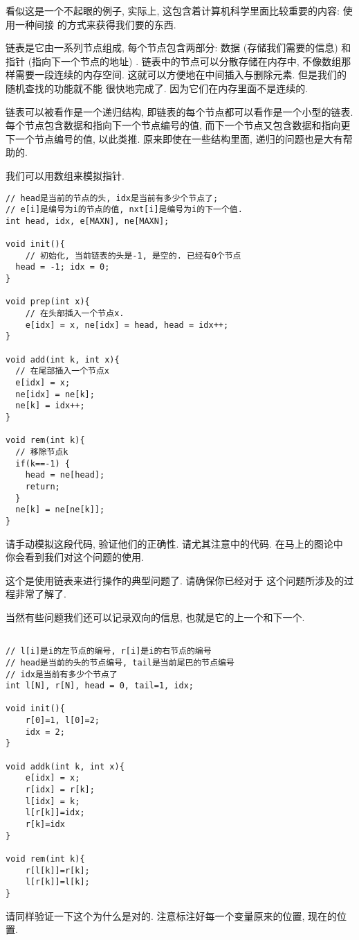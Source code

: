 看似这是一个不起眼的例子, 实际上, 这包含着计算机科学里面比较重要的内容: 使用一种间接
的方式来获得我们要的东西. 

 链表是它由一系列节点组成, 每个节点包含两部分: 
数据 (存储我们需要的信息) 和指针 (指向下一个节点的地址) . 
链表中的节点可以分散存储在内存中, 不像数组那样需要一段连续的内存空间. 
这就可以方便地在中间插入与删除元素. 但是我们的随机查找的功能就不能
很快地完成了. 因为它们在内存里面不是连续的. 

链表可以被看作是一个递归结构, 即链表的每个节点都可以看作是一个小型的链表. 
每个节点包含数据和指向下一个节点编号的值, 而下一个节点又包含数据和指向更下一个节点编号的值, 
以此类推. 
原来即使在一些结构里面, 递归的问题也是大有帮助的. 

我们可以用数组来模拟指针. 
\begin{lstlisting}
// head是当前的节点的头, idx是当前有多少个节点了; 
// e[i]是编号为i的节点的值, nxt[i]是编号为i的下一个值. 
int head, idx, e[MAXN], ne[MAXN];

void init(){
    // 初始化, 当前链表的头是-1, 是空的. 已经有0个节点
  head = -1; idx = 0;
}

void prep(int x){
    // 在头部插入一个节点x. 
    e[idx] = x, ne[idx] = head, head = idx++;
}

void add(int k, int x){
  // 在尾部插入一个节点x
  e[idx] = x;
  ne[idx] = ne[k];
  ne[k] = idx++;
}

void rem(int k){
  // 移除节点k
  if(k==-1) {
    head = ne[head];
    return;
  }
  ne[k] = ne[ne[k]];
}
\end{lstlisting}

\begin{ques}
    请手动模拟这段代码, 验证他们的正确性. 请尤其注意中的代码. 在马上的图论中
    你会看到我们对这个问题的使用. 
\end{ques}

 这个是使用链表来进行操作的典型问题了. 请确保你已经对于
这个问题所涉及的过程非常了解了. 

 当然有些问题我们还可以记录双向的信息, 也就是它的上一个和下一个.

\begin{lstlisting}

// l[i]是i的左节点的编号, r[i]是i的右节点的编号
// head是当前的头的节点编号, tail是当前尾巴的节点编号
// idx是当前有多少个节点了
int l[N], r[N], head = 0, tail=1, idx;

void init(){
    r[0]=1, l[0]=2;
    idx = 2;
}

void addk(int k, int x){
    e[idx] = x;
    r[idx] = r[k];
    l[idx] = k;
    l[r[k]]=idx;
    r[k]=idx
}

void rem(int k){
    r[l[k]]=r[k];
    l[r[k]]=l[k];
}
\end{lstlisting}
\begin{ques}
    请同样验证一下这个为什么是对的. 注意标注好每一个变量原来的位置, 现在的位置. 
\end{ques}

